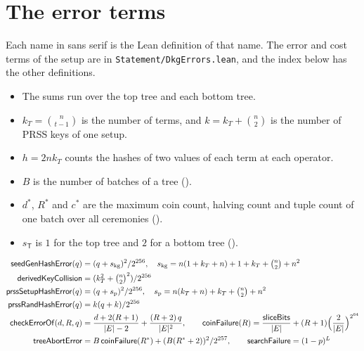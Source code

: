 \documentclass[11pt]{article}
\makeatletter
\renewcommand\paragraph{\@startsection{paragraph}{4}{\z@}{-2.25ex \@plus -.8ex \@minus -.2ex}{0.4ex}{\normalfont\normalsize\bfseries}}
\makeatother
\begin{document}
\section{The error terms}\label{sec:terms}
Each name in sans serif is the Lean definition of that name. The error and cost terms of the setup
are in \texttt{Statement/DkgErrors.lean}, and the index below has the other definitions.
\begin{itemize}
\item The sums run over the top tree and each bottom tree.
\item $k_T=\binom n{t-1}$ is the number of terms, and $k=k_T+\binom n2$ is the number of PRSS keys
of one setup.
\item $h=2nk_T$ counts the hashes of two values of each term at each operator.
\item $B$ is the number of batches of a tree ().
\item $d^*$, $R^*$ and $c^*$ are the maximum coin count, halving count and tuple count of one batch
over all ceremonies ().
\item $s_{\mathsf T}$ is $1$ for the top tree and $2$ for a bottom tree ().
\end{itemize}

\paragraph{Common terms}
{\small
\begin{align*}
\mathsf{seedGenHashError}(q)&=(q+s_{\mathrm{kg}})^2/2^{256},\quad s_{\mathrm{kg}}=n(1+k_T+n)+1+k_T+\tbinom n2+n^2\\
\mathsf{derivedKeyCollision}&=(k_T^2+\tbinom n2^2)/2^{256}\\
\mathsf{prssSetupHashError}(q)&=(q+s_{\mathrm p})^2/2^{256},\quad s_{\mathrm p}=n(k_T+n)+k_T+\tbinom n2+n^2\\
\mathsf{prssRandHashError}(q)&=k(q+k)/2^{256}\\
\mathsf{checkErrorOf}(d,R,q)&=\frac{d+2(R+1)}{|E|-2}+\frac{(R+2)\,q}{|E|^2},\qquad
\mathsf{coinFailure}(R)=\frac{\mathsf{sliceBits}}{|E|}+(R+1)\Bigl(\frac{2}{|E|}\Bigr)^{2^{64}}\\
\mathsf{treeAbortError}&=B\,\mathsf{coinFailure}(R^*)+(B(R^*+2))^2/2^{257},\qquad
\mathsf{searchFailure}=(1-p)^L
\end{align*}}
\end{document}
